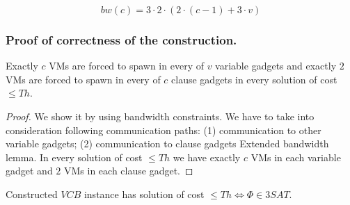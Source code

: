 $$ bw(c) = 3  \cdot  2  \cdot  (2  \cdot  (c - 1) + 3  \cdot  v) $$

\subsubsection{Proof of correctness of the construction.}

\begin{lemma}
Exactly $c$ VMs are forced to spawn in every of $v$ variable gadgets
and exactly $2$ VMs are forced to spawn in every of $c$ clause gadgets
in every solution of cost $\leq Th$.
\end{lemma}

\begin{proof}
We show it by using bandwidth constraints. We have to take into
consideration following communication paths: (1) communication to
other variable gadgets; (2) communication to clause gadgets Extended
bandwidth lemma. In every solution of cost $\leq Th$ we have exactly
$c$ VMs in each variable gadget and $2$ VMs in each clause gadget.

\end{proof}

\begin{theorem}Constructed $VCB$ instance has solution of cost $\leq
  Th \iff \Phi \in 3SAT$.
\end{theorem}

